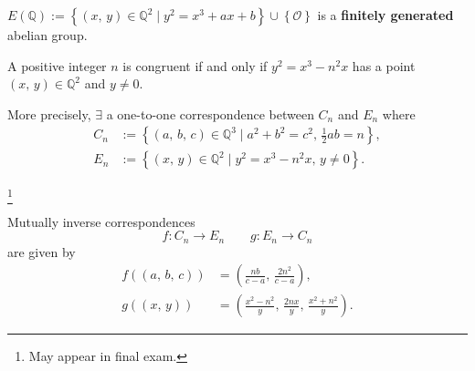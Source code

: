 \begin{theorem}
    $E\left(\mathbb{Q}\right):=\left\{\left(x,\,y\right)\in\mathbb{Q}^2 \mid y^2=x^3+ax+b\right\}
    \cup \left\{\mathcal{O}\right\}$ is a \textbf{finitely generated} abelian group.
\end{theorem}

\begin{theorem}
    A positive integer $n$ is congruent if and only if $y^2=x^3-n^2x$ has a
    point $\left(x,\,y\right)\in\mathbb{Q}^2$ and $y \neq 0$.

    More precisely, $\exists$ a one-to-one correspondence between $C_n$ and $E_n$ where
    \begin{align*}
        C_n &:= \left\{\left(a,\,b,\,c\right)\in\mathbb{Q}^3 \mid a^2+b^2=c^2,\,\frac{1}{2}ab=n\right\},\\
        E_n &:= \left\{\left(x,\,y\right)\in\mathbb{Q}^2 \mid y^2=x^3-n^2x,\,y\neq 0\right\}.
    \end{align*}
\end{theorem}
\footnote{May appear in final exam.}

Mutually inverse correspondences
\[
    f: C_n \rightarrow E_n \qquad g: E_n \rightarrow C_n
\]
are given by
\begin{align*}
    f\left(\left(a,\,b,\,c\right)\right) &= \left(\frac{nb}{c-a},\,\frac{2n^2}{c-a}\right),\\
    g\left(\left(x,\,y\right)\right) &= \left(\frac{x^2-n^2}{y},\,\frac{2nx}{y},\,\frac{x^2+n^2}{y}\right).
\end{align*}

